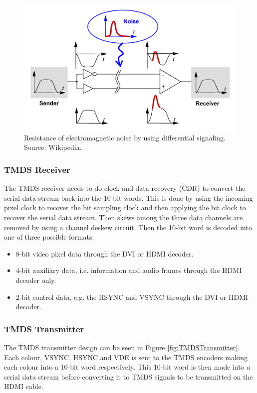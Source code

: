 \begin{figure}[h]
    \centering
    \includegraphics{img/DiffSignaling.png}
    \caption[Resistance of electromagnetic noise by using differential signaling.]{Resistance of electromagnetic noise by using differential signaling. Source: Wikipedia\cite{wikids}.}
    \label{fig:differential_signal}
\end{figure}

\subsubsection{TMDS Receiver}
The TMDS receiver needs to do clock and data recovery (CDR) to convert the serial data stream back into the 10-bit words.
This is done by using the incoming pixel clock to recover the bit sampling clock and then applying the bit clock to recover the serial data stream.
Then skews among the three data channels are removed by using a channel deskew circuit.
Then the 10-bit word is decoded into one of three possible formats:
\begin{itemize}
    \item   8-bit video pixel data through the DVI or HDMI decoder.
    \item   4-bit auxiliary data, i.e. information and audio frames through the HDMI decoder only.
    \item   2-bit control data, e.g. the HSYNC and VSYNC through the DVI or HDMI decoder.
\end{itemize}

\subsubsection{TMDS Transmitter}
The TMDS transmitter design can be seen in Figure \ref{fig:TMDSTransmitter}.
Each colour, VSYNC, HSYNC and VDE is sent to the TMDS encoders making each colour into a 10-bit word respectively. This 10-bit word is then made into a serial data stream before converting it to TMDS signals to be transmitted on the HDMI cable.

